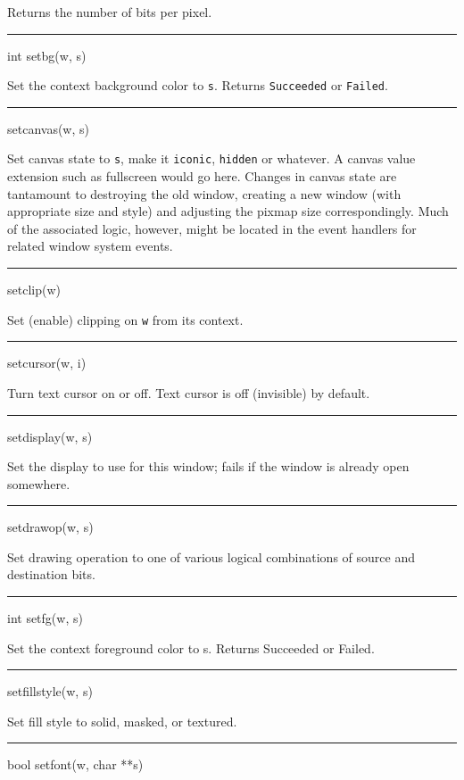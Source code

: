 Returns the number of bits per pixel.


\bigskip\hrule\vspace{0.1cm}
\noindent
int setbg(w, s)


Set the context background color to \texttt{s}. Returns
\texttt{Succeeded} or \texttt{Failed}.


\bigskip\hrule\vspace{0.1cm}
\noindent
setcanvas(w, s)


Set canvas state to \texttt{s}, make it
\texttt{{\textquotedbl}iconic{\textquotedbl}},
\texttt{{\textquotedbl}hidden{\textquotedbl}} or whatever. A canvas
value extension such as fullscreen would go here.  Changes in canvas
state are tantamount to destroying the old window, creating a new
window (with appropriate size and style) and adjusting the pixmap size
correspondingly. Much of the associated logic, however, might be
located in the event handlers for related window system events.


\bigskip\hrule\vspace{0.1cm}
\noindent
setclip(w)


Set (enable) clipping on \texttt{w} from its context.


\bigskip\hrule\vspace{0.1cm}
\noindent
setcursor(w, i)


Turn text cursor on or off. Text cursor is off (invisible) by default.


\bigskip\hrule\vspace{0.1cm}
\noindent
setdisplay(w, s)


Set the display to use for this window; fails if the window is already
open somewhere.


\bigskip\hrule\vspace{0.1cm}
\noindent
setdrawop(w, s)


Set drawing operation to one of various logical combinations of source
and destination bits.


\bigskip\hrule\vspace{0.1cm}
\noindent
int setfg(w, s)


Set the context foreground color to s. Returns Succeeded or Failed.


\bigskip\hrule\vspace{0.1cm}
\noindent
setfillstyle(w, s)


Set fill style to solid, masked, or textured.


\bigskip\hrule\vspace{0.1cm}
\noindent
bool setfont(w, char **s)



